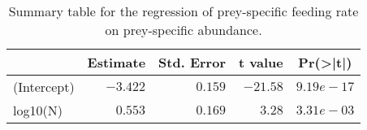 \begin{table}[!htbp]
\caption{Summary table for the regression of prey-specific feeding rate 
  on prey-specific abundance.\label{tab:FN}} 
\begin{center}
\begin{tabular}{lrrrr}
\hline
\multicolumn{1}{l}{}&\multicolumn{1}{c}{Estimate}&\multicolumn{1}{c}{Std. Error}&\multicolumn{1}{c}{t value}&\multicolumn{1}{c}{Pr(\textgreater |t|)}\tabularnewline
\hline
(Intercept)&$-3.422$&$0.159$&$-21.58$&$9.19e-17$\tabularnewline
log10(N)&$ 0.553$&$0.169$&$  3.28$&$3.31e-03$\tabularnewline
\hline
\end{tabular}\end{center}
\end{table}
